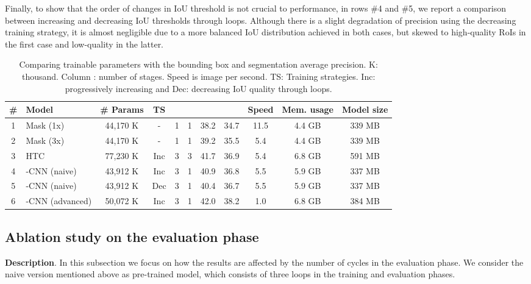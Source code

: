 \documentclass[runningheads, orivec]{llncs}
\begin{document}
Finally, to show that the order of changes in IoU threshold is not crucial to performance, in rows \#4 and \#5, we report a comparison between increasing and decreasing IoU thresholds through loops.
Although there is a slight degradation of precision using the decreasing training strategy, it is almost negligible due to a more balanced IoU distribution achieved in both cases, but skewed to high-quality RoIs in the first case and low-quality in the latter. \begin{table}[t]
	\small
	\setlength{\tabcolsep}{2.5pt}
	\begin{center}
		\begin{tabular}{c|l|c|c|c|c|c|c|c|c|c}
\# & Model & \# Params & TS &  &  &  &  & Speed & Mem. usage & Model size \\
			\hline\hline
			1 & Mask (1x)           & 44,170 K & -   & 1 & 1 & 38.2 & 34.7 & 11.5 & 4.4 GB  & 339 MB \\
			2 & Mask (3x)           & 44,170 K & -   & 1 & 1 & 39.2 & 35.5 &  5.4 & 4.4 GB  & 339 MB \\
			3 & HTC                 & 77,230 K & Inc & 3 & 3 & 41.7 & 36.9 &  5.4 & 6.8 GB  & 591 MB \\
			\hline
4 & -CNN (naive)   & 43,912 K & Inc & 3 & 1 & 40.9 & 36.8 &  5.5 & 5.9 GB  & 337 MB \\
5 & -CNN (naive)   & 43,912 K & Dec & 3 & 1 & 40.4 & 36.7 &  5.5 & 5.9 GB  & 337 MB \\
6 & -CNN (advanced)& 50,072 K & Inc & 3 & 1 & 42.0 & 38.2 &  1.0 & 6.8 GB  & 384 MB
		\end{tabular}
	\end{center}
	\caption{Comparing trainable parameters with the bounding box and segmentation average precision. K: thousand. Column : number of stages. Speed is image per second.
		TS: Training strategies. Inc: progressively increasing and Dec: decreasing IoU quality through loops.}
	\label{tab:count_parameters}
\end{table}

 \subsection{Ablation study on the evaluation phase}
\noindent\textbf{Description}.
In this subsection we focus on how the results are affected by the number of cycles in the evaluation phase.
We consider the naive version mentioned above as pre-trained model, which consists of three loops in the training and evaluation phases.
\end{document}

